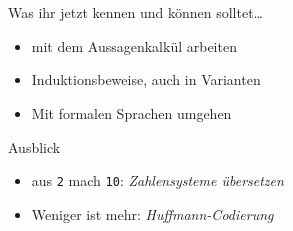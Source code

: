 \section{}
	\begin{frame}{Was ihr jetzt kennen und können solltet\dots}
			\begin{itemize}
				\item mit dem Aussagenkalkül arbeiten
				\item Induktionsbeweise, auch in Varianten
				\item Mit formalen Sprachen umgehen
			\end{itemize}
	
	\end{frame}
	\begin{frame}{Ausblick}
		\begin{itemize}
			\item aus \texttt{2} mach \texttt{10}: \emph{Zahlensysteme übersetzen} 
			\item Weniger ist mehr: \emph{Huffmann-Codierung}
		\end{itemize}
	\end{frame}
\section{}
\questionframe
\lastframe
